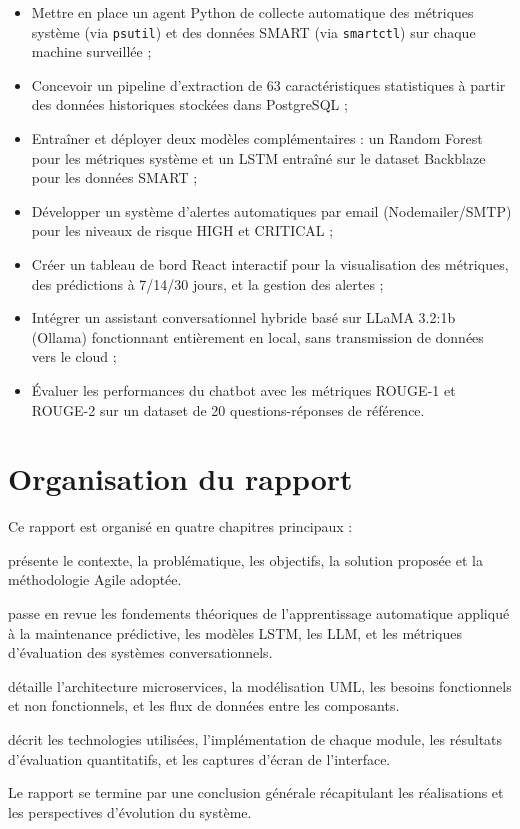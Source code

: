 \begin{itemize}[leftmargin=1.5cm]
  \item Mettre en place un agent Python de collecte automatique des métriques système
        (via \texttt{psutil}) et des données SMART (via \texttt{smartctl}) sur chaque
        machine surveillée ;
  \item Concevoir un pipeline d'extraction de 63 caractéristiques statistiques à partir
        des données historiques stockées dans PostgreSQL ;
  \item Entraîner et déployer deux modèles complémentaires : un Random Forest pour les
        métriques système et un LSTM entraîné sur le dataset Backblaze pour les données
        SMART ;
  \item Développer un système d'alertes automatiques par email (Nodemailer/SMTP) pour
        les niveaux de risque HIGH et CRITICAL ;
  \item Créer un tableau de bord React interactif pour la visualisation des métriques,
        des prédictions à 7/14/30 jours, et la gestion des alertes ;
  \item Intégrer un assistant conversationnel hybride basé sur LLaMA 3.2:1b (Ollama)
        fonctionnant entièrement en local, sans transmission de données vers le cloud ;
  \item Évaluer les performances du chatbot avec les métriques ROUGE-1 et ROUGE-2 sur
        un dataset de 20 questions-réponses de référence.
\end{itemize}

\section*{Organisation du rapport}

Ce rapport est organisé en quatre chapitres principaux :

\begin{description}[leftmargin=2cm, style=nextline]
  \item[\textbf{Chapitre 1 — Vue d'ensemble du projet :}] présente le contexte, la
  problématique, les objectifs, la solution proposée et la méthodologie Agile adoptée.

  \item[\textbf{Chapitre 2 — État de l'art :}] passe en revue les fondements théoriques
  de l'apprentissage automatique appliqué à la maintenance prédictive, les modèles LSTM,
  les LLM, et les métriques d'évaluation des systèmes conversationnels.

  \item[\textbf{Chapitre 3 — Conception du système :}] détaille l'architecture
  microservices, la modélisation UML, les besoins fonctionnels et non fonctionnels,
  et les flux de données entre les composants.

  \item[\textbf{Chapitre 4 — Implémentation technique :}] décrit les technologies
  utilisées, l'implémentation de chaque module, les résultats d'évaluation quantitatifs,
  et les captures d'écran de l'interface.
\end{description}

Le rapport se termine par une conclusion générale récapitulant les réalisations et les
perspectives d'évolution du système.
